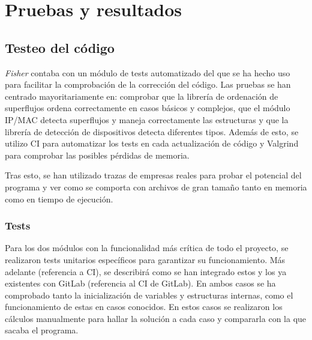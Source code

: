 \documentclass[twoside, 12pt]{epstfg}
\begin{document}
\chapter{Pruebas y resultados}
\section{Testeo del código}
\label{chap:Pruebas:Test}
\textit{Fisher} contaba con un módulo de tests automatizado del que se ha hecho uso para facilitar la comprobación de la corrección del código. Las pruebas se han centrado mayoritariamente en: comprobar que la librería de ordenación de superflujos ordena correctamente en casos básicos y complejos, que el módulo IP/MAC detecta superflujos y maneja correctamente las estructuras y que la librería de detección de dispositivos detecta diferentes tipos. Además de esto, se utilizo CI para automatizar los tests en cada actualización de código y Valgrind para comprobar las posibles pérdidas de memoria.

Tras esto, se han utilizado trazas de empresas reales para probar el potencial del programa y ver como se comporta con archivos de gran tamaño tanto en memoria como en tiempo de ejecución. 

\subsection{Tests}
\label{subsec:Pruebas:Tests:Tests}

Para los dos módulos con la funcionalidad más crítica de todo el proyecto, se realizaron tests unitarios específicos para garantizar su funcionamiento. Más adelante (referencia a CI), se describirá como se han integrado estos  y los ya existentes con GitLab (referencia al CI de GitLab). En ambos casos se ha comprobado tanto la inicialización de variables y estructuras internas, como el funcionamiento de estas en casos conocidos. En estos casos se realizaron los cálculos manualmente para hallar la solución a cada caso y compararla con la que sacaba el programa.
\end{document}

